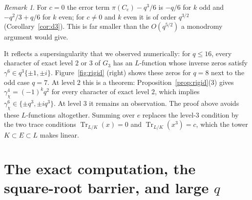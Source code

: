 \documentclass[11pt,a4paper]{amsart}
\theoremstyle{definition}
\theoremstyle{remark}
\newtheorem{remark}[theorem]{Remark}
\newcommand{\Tr}{\operatorname{Tr}}
\begin{document}


\begin{remark}\label{rem:super}
For $c=0$ the error term $\pi(C_e)-q^3/6$ is $-q/6$ for $k$ odd and $-q^2/3+q/6$ for $k$ even; for $c\ne0$ and $k$ even it is of order $q^{3/2}$ (Corollary~\ref{cor:d3}). This is far smaller than the
$O(q^{5/2})$ a monodromy argument would give.

It reflects a supersingularity that we observed numerically: for $q\le16$, every character of exact level $2$ or $3$
of $G_3$ has an $L$-function whose inverse zeros satisfy $\gamma^6\in q^3\{\pm1,\pm i\}$. Figure~\ref{fig:rigid} (right) shows these zeros for $q=8$ next to the odd case $q=7$. At level $2$ this is a
theorem: Proposition~\ref{prop:rigid}(3) gives $\gamma_\chi^4=(-1)^kq^2$ for every character of exact level $2$,
which implies $\gamma_\chi^6\in\{\pm q^3,\pm iq^3\}$. At level $3$ it remains an observation. The proof above avoids
these $L$-functions altogether. Summing over $e$ replaces the level-$3$ condition by the two trace conditions
$\Tr_{L/K}(x)=0$ and $\Tr_{L/K}(x^3)=c$, which the tower $K\subset E\subset L$ makes linear.
\end{remark}


\FloatBarrier

\section{The exact computation, the square-root barrier, and large \texorpdfstring{$q$}{q}}\label{sec:comp}
\end{document}
